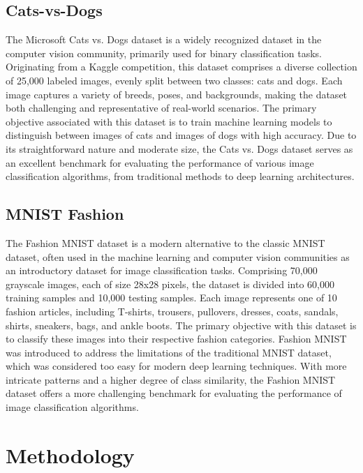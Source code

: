 \documentclass[journal]{IEEEtran}
\begin{document}
	\subsection{Cats-vs-Dogs}	
	The Microsoft Cats vs. Dogs dataset \cite{Cats-vs-Dogs} is a widely recognized dataset in the computer vision community, 
	primarily used for binary classification tasks. Originating from a Kaggle competition, 
	this dataset comprises a diverse collection of 25,000 labeled images, evenly split between two classes: cats and dogs. 
	Each image captures a variety of breeds, poses, and backgrounds, making the dataset both challenging and representative of real-world scenarios. 
	The primary objective associated with this dataset is to train machine learning models to distinguish between images of cats and images of dogs with high accuracy. 
	Due to its straightforward nature and moderate size, the Cats vs. Dogs dataset serves as an excellent benchmark for evaluating the 
	performance of various image classification algorithms, from traditional methods to deep learning architectures.
	
	\subsection{MNIST Fashion}
	The Fashion MNIST dataset \cite{Fashion_MNIST} is a modern alternative to the classic MNIST dataset, 
	often used in the machine learning and computer vision communities as an introductory dataset for image classification tasks. 
	Comprising 70,000 grayscale images, each of size 28x28 pixels, the dataset is divided into 60,000 training samples and 10,000 testing samples. 
	Each image represents one of 10 fashion articles, including T-shirts, trousers, pullovers, dresses, coats, sandals, shirts, sneakers, bags, and ankle boots. 
	The primary objective with this dataset is to classify these images into their respective fashion categories. 
	Fashion MNIST was introduced to address the limitations of the traditional MNIST dataset, which was considered too easy for modern deep learning techniques. 
	With more intricate patterns and a higher degree of class similarity, the Fashion MNIST dataset offers a more challenging benchmark 
	for evaluating the performance of image classification algorithms.

	
	\section{Methodology}
	\label{sec:methodology}
	
\end{document}
